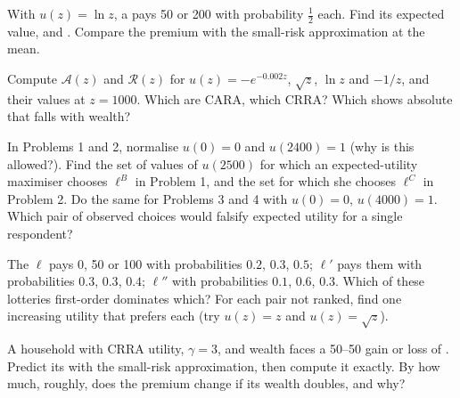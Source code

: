 \begin{exercise}[$\star$]\label{exo:b2:expected-utility:3}
With $u(z) = \ln z$, a  pays \num{50} or \num{200} with probability $\tfrac12$ each. Find its
expected value,  and . Compare the premium with the small-risk
approximation at the mean.
\end{exercise}

\begin{exercise}[$\star$]\label{exo:b2:expected-utility:4}
Compute $\mathcal{A}(z)$ and $\mathcal{R}(z)$ for $u(z) = -e^{-0.002z}$, $\sqrt z$, $\ln z$ and $-1/z$,
and their values at $z = \num{1000}$. Which are CARA, which CRRA? Which shows absolute 
that falls with wealth?
\end{exercise}

\begin{exercise}[$\star\star$]\label{exo:b2:expected-utility:5}
In Problems 1 and 2, normalise $u(0) = 0$ and $u(\num{2400}) = 1$ (why is this allowed?). Find the set
of values of $u(\num{2500})$ for which an expected-utility maximiser chooses $\ell^{B}$ in Problem 1,
and the set for which she chooses $\ell^{C}$ in Problem 2. Do the same for Problems 3 and 4 with $u(0)
= 0$, $u(\num{4000}) = 1$. Which pair of observed choices would falsify expected utility for a single
respondent?
\end{exercise}

\begin{exercise}[$\star\star$]\label{exo:b2:expected-utility:6}
The  $\ell$ pays 0, \num{50} or \num{100} with probabilities $0.2$, $0.3$, $0.5$; $\ell'$ pays
them with probabilities $0.3$, $0.3$, $0.4$; $\ell''$ with probabilities $0.1$, $0.6$, $0.3$. Which of
these lotteries first-order dominates which? For each pair not ranked, find one increasing utility
that prefers each  (try $u(z) = z$ and $u(z) = \sqrt z$).
\end{exercise}

\begin{exercise}[$\star\star$]\label{exo:b2:expected-utility:7}
A household with CRRA utility, $\gamma = 3$, and wealth  faces a 50--50 gain or loss of
. Predict its  with the small-risk approximation, then compute it exactly. By how
much, roughly, does the premium change if its wealth doubles, and why?
\end{exercise}

